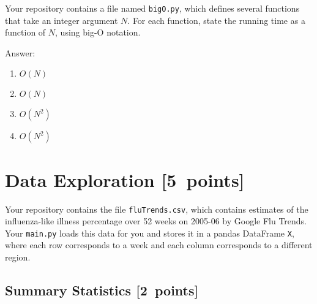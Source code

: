 \documentclass{article}
\newcommand{\blu}[1]{{\textcolor{blu}{#1}}}
\newcommand{\gre}[1]{\textcolor{gre}{#1}}
\newcommand\ans[1]{\par\gre{Answer: #1}}
\let\ask\blu
\newcommand\pts[1]{\textcolor{pointscolour}{[#1~points]}}
\begin{document}
  Your repository contains a file named \texttt{bigO.py}, which defines several functions
  that take an integer argument $N$. For each function, \ask{state the running time as a function of $N$, using big-O notation}.
  \ans{
  \begin{enumerate}
  \item $O(N)$
  \item $O(N)$
  \item $O(N^2)$
  \item $O(N^2)$
  \end{enumerate}
  }
  \newpage
  \section{Data Exploration \pts{5}}


  Your repository contains the file \texttt{fluTrends.csv}, which contains estimates
  of the influenza-like illness percentage over 52 weeks on 2005-06 by Google Flu Trends.
  Your \texttt{main.py} loads this data for you and stores it in a pandas DataFrame \texttt{X},
  where each row corresponds to a week and each column
  corresponds to a different
  region. 

  \subsection{Summary Statistics \pts{2}}
\end{document}
